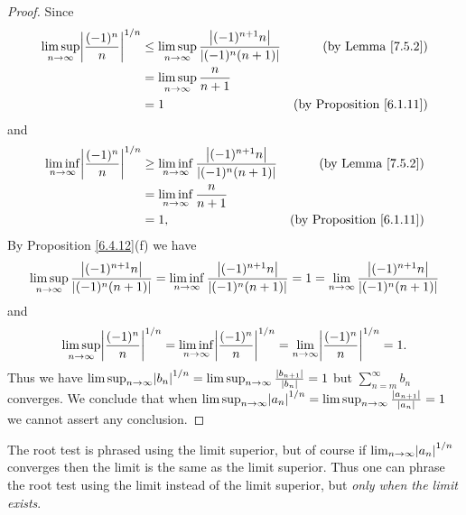\begin{proof}
    Since
    \begin{align*}
        \limsup_{n \to \infty} \abs*{\frac{(-1)^n}{n}}^{1 / n} & \leq \limsup_{n \to \infty} \frac{\abs*{(-1)^{n + 1} n}}{\abs*{(-1)^n (n + 1)}} & \text{(by Lemma \ref{7.5.2})}        \\
                                                               & = \limsup_{n \to \infty} \frac{n}{n + 1}                                                                               \\
                                                               & = 1                                                                             & \text{(by Proposition \ref{6.1.11})}
    \end{align*}
    and
    \begin{align*}
        \liminf_{n \to \infty} \abs*{\frac{(-1)^n}{n}}^{1 / n} & \geq \liminf_{n \to \infty} \frac{\abs*{(-1)^{n + 1} n}}{\abs*{(-1)^n (n + 1)}} & \text{(by Lemma \ref{7.5.2})}        \\
                                                               & = \liminf_{n \to \infty} \frac{n}{n + 1}                                                                               \\
                                                               & = 1,                                                                            & \text{(by Proposition \ref{6.1.11})}
    \end{align*}
    By Proposition \ref{6.4.12}(f) we have
    \[
        \limsup_{n \to \infty} \frac{\abs*{(-1)^{n + 1} n}}{\abs*{(-1)^n (n + 1)}} = \liminf_{n \to \infty} \frac{\abs*{(-1)^{n + 1} n}}{\abs*{(-1)^n (n + 1)}} = 1 = \lim_{n \to \infty} \frac{\abs*{(-1)^{n + 1} n}}{\abs*{(-1)^n (n + 1)}}
    \]
    and
    \[
        \limsup_{n \to \infty} \abs*{\frac{(-1)^n}{n}}^{1 / n} = \liminf_{n \to \infty} \abs*{\frac{(-1)^n}{n}}^{1 / n} = \lim_{n \to \infty} \abs*{\frac{(-1)^n}{n}}^{1 / n} = 1.
    \]
    Thus we have \(\limsup_{n \to \infty} \abs*{b_n}^{1 / n} = \limsup_{n \to \infty} \frac{\abs*{b_{n + 1}}}{\abs*{b_n}} = 1\) but \(\sum_{n = m}^\infty b_n\) converges.
    We conclude that when \(\limsup_{n \to \infty} \abs*{a_n}^{1 / n} = \limsup_{n \to \infty} \frac{\abs*{a_{n + 1}}}{\abs*{a_n}} = 1\) we cannot assert any conclusion.
\end{proof}

\begin{note}
    The root test is phrased using the limit superior, but of course if \(\lim_{n \to \infty} \abs*{a_n}^{1 / n}\) converges then the limit is the same as the limit superior.
    Thus one can phrase the root test using the limit instead of the limit superior, but \emph{only when the limit exists}.
\end{note}

